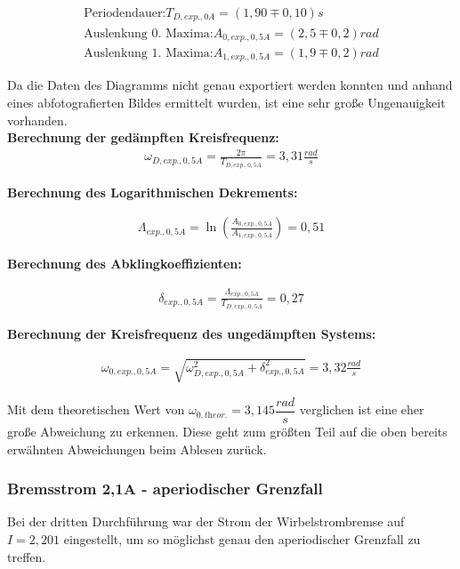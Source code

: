 \documentclass[a4paper]{scrartcl}
\numberwithin{equation}{subsection}
\begin{document}
\begin{align*}
\text{Periodendauer:} T_{D,\textit{exp.},0A} = (1,90\mp0,10)s \\
\text{Auslenkung 0. Maxima:} A_{0,\textit{exp.},0,5A} = (2,5\mp0,2)rad \\
\text{Auslenkung 1. Maxima:} A_{1,\textit{exp.},0,5A} = (1,9\mp0,2)rad
\end{align*}

Da die Daten des Diagramms nicht genau exportiert werden konnten und anhand eines abfotografierten Bildes ermittelt wurden, ist eine sehr große Ungenauigkeit vorhanden. \\

\textbf{Berechnung der gedämpften Kreisfrequenz:}
\begin{align}
\omega_{D,\textit{exp.},0,5A} = \frac{2\pi}{T_{D,\textit{exp.},0,5A}} = 3,31 \frac{rad}{s}
\end{align}

\textbf{Berechnung des Logarithmischen Dekrements:}

\begin{align}
\Lambda_{\textit{exp.},0,5A} = \ln(\frac{A_{0,\textit{exp.},0,5A}}{A_{1,\textit{exp.},0,5A}}) = 0,51
\end{align}

\textbf{Berechnung des Abklingkoeffizienten:}

\begin{align}
\delta_{\textit{exp.},0,5A} = \frac{\Lambda_{\textit{exp.},0,5A}}{T_{D,\textit{exp.},0,5A}} = 0,27
\end{align}

\textbf{Berechnung der Kreisfrequenz des ungedämpften Systems:}

\begin{align}
\omega_{0,\textit{exp.},0,5A} = \sqrt{\omega_{D,\textit{exp.},0,5A}^2 + \delta_{\textit{exp.},0,5A}^2} = 3,32 \frac{rad}{s}
\end{align}

Mit dem theoretischen Wert von $\omega_{0,\textit{theor.}} = 3,145 \dfrac{rad}{s}$ verglichen ist eine eher große Abweichung zu erkennen. Diese geht zum größten Teil auf die oben bereits erwähnten Abweichungen beim Ablesen zurück.

\subsubsection{Bremsstrom 2,1A - aperiodischer Grenzfall}
Bei der dritten Durchführung war der Strom der Wirbelstrombremse auf $I = 2,201$ eingestellt, um so möglichst genau den aperiodischer Grenzfall zu treffen.
\end{document}
